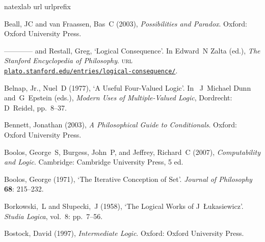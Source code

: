 \documentclass[openany,leqno,10pt]{book}
\theoremstyle{break}
\theoremstyle{definition}
\theoremstyle{remark}
\begin{document}
{\small{}\label{listtable}
 \listoftables}

{\small{}
\listoffigures}

\newpage
{}



{\small {}\label{biblio}
\begin{thebibliography}{39}
\newcommand{\enquote}[1]{‘#1’}
\expandafter\ifx\csname natexlab\endcsname\relax\def\natexlab#1{#1}\fi
\expandafter\ifx\csname url\endcsname\relax
  \def\url#1{{\tt #1}}\fi
\expandafter\ifx\csname urlprefix\endcsname\relax\def\urlprefix{\textsc{url} }\fi

Beall, JC and van Fraassen, Bas~C (2003), \emph{Possibilities and Paradox}.
  Oxford: Oxford University Press.

---\!\!---\!\!---\!\!--- and Restall, Greg, \enquote{Logical Consequence}.  In Edward~N Zalta (ed.), \emph{The Stanford Encyclopedia of Philosophy}. \urlprefix\href{http://plato.stanford.edu/entries/logical-consequence/}{\nolinkurl{plato.stanford.edu/entries/logical-consequence/}}.

{Belnap, Jr.}, Nuel~D (1977), \enquote{A Useful Four-Valued Logic}. In
 ~J~Michael Dunn and~G~Epstein (eds.), \emph{Modern Uses of Multiple-Valued
  Logic}, Dordrecht: D~Reidel, pp.~8–37.

Bennett, Jonathan (2003), \emph{A Philosophical Guide to Conditionals}.
  Oxford: Oxford University Press.

Boolos, George~S, Burgess, John~P, and Jeffrey, Richard~C (2007), \emph{
  Computability and Logic}. Cambridge: Cambridge University Press, 5 ed.

 Boolos, George (1971), ‘The Iterative Conception of Set’. \emph{Journal of Philosophy} \textbf{68}: 215–232.


Borkowski,~L and S{\l}upecki,~J (1958), \enquote{The Logical Works of J~{\L}ukasiewicz}. \emph{Studia Logica}, vol.~8: pp.~7–56.

Bostock, David (1997), \emph{Intermediate Logic}. Oxford: Oxford University
  Press.


\end{thebibliography}}
\end{document}
